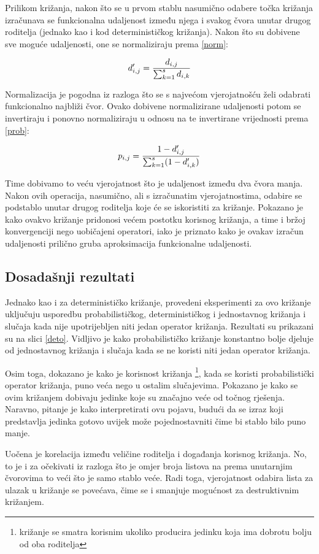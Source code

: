Prilikom križanja, nakon što se u prvom stablu nasumično odabere točka križanja izračunava se funkcionalna udaljenost između njega i svakog čvora unutar drugog roditelja (jednako kao i kod determinističkog križanja). Nakon što su dobivene sve moguće udaljenosti, one se normaliziraju prema \ref{norm}:

\begin{equation} 
\label{norm}
 \large{ d '_{i,j} = \frac{d_{i,j}}{\sum_{k=1}^{s} d_{i,k}} }
\end{equation}
 
Normalizacija je pogodna iz razloga što se s najvećom vjerojatnošću želi odabrati funkcionalno najbliži čvor. Ovako dobivene normalizirane udaljenosti potom se invertiraju i ponovno normaliziraju u odnosu na te invertirane vrijednosti prema \ref{prob}:
 
 \begin{equation} 
\label{prob}
 \large{ p_{i,j} = \frac{1 - d '_{i,j}}{\sum_{k=1}^{s} (1 - d '_{i,k})} }
\end{equation}

Time dobivamo to veću vjerojatnost što je udaljenost između dva čvora manja. Nakon ovih operacija, nasumično, ali s izračunatim vjerojatnostima, odabire se podstablo unutar drugog roditelja koje će se iskoristiti za križanje. Pokazano je kako ovakvo križanje pridonosi većem postotku korisnog križanja, a time i bržoj konvergenciji nego uobičajeni operatori, iako je priznato kako je ovakav izračun udaljenosti prilično gruba aproksimacija funkcionalne udaljenosti.

\subsection{Dosadašnji rezultati}
Jednako kao i za determinističko križanje, provedeni eksperimenti za ovo križanje uključuju usporedbu probabilističkog, determinističkog i jednostavnog križanja i slučaja kada nije upotrijebljen niti jedan operator križanja. Rezultati su prikazani su na slici \ref{deto}. Vidljivo je kako probabilističko križanje konstantno bolje djeluje od jednostavnog križanja i slučaja kada se ne koristi niti jedan operator križanja.

Osim toga, dokazano je kako je korisnost križanja \footnote{križanje se smatra korisnim ukoliko producira jedinku koja ima dobrotu bolju od oba roditelja}, kada se koristi probabilistički operator križanja, puno veća nego u ostalim slučajevima. Pokazano je kako se ovim križanjem dobivaju jedinke koje su značajno veće od točnog rješenja. Naravno, pitanje je kako interpretirati ovu pojavu, budući da se izraz koji predstavlja jedinka gotovo uvijek može pojednostavniti čime bi stablo bilo puno manje.

Uočena je korelacija između veličine roditelja i događanja korisnog križanja. No, to je i za očekivati iz razloga što je omjer broja listova na prema unutarnjim čvorovima to veći što je samo stablo veće. Radi toga, vjerojatnost odabira lista za ulazak u križanje se povećava, čime se i smanjuje mogućnost za destruktivnim križanjem. 